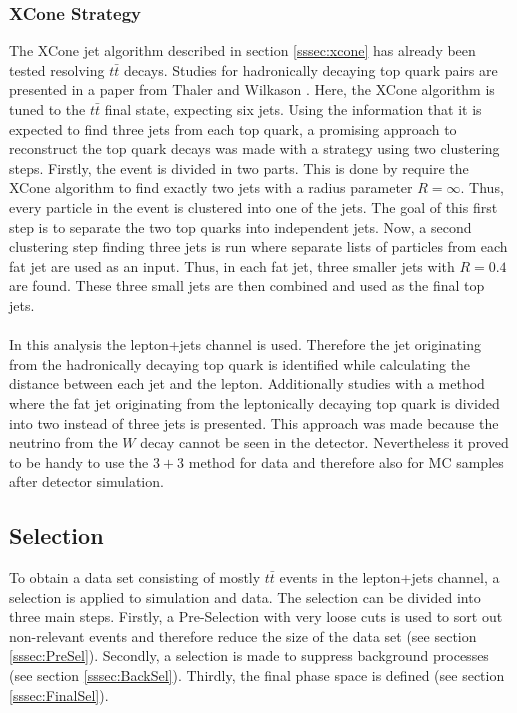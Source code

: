 \subsubsection{XCone Strategy}
	The XCone jet algorithm described in section \ref{sssec:xcone} has already been tested resolving $t\bar{t}$ decays. Studies for hadronically decaying top quark pairs are presented in a paper from Thaler and Wilkason \cite{xconetop}. Here, the XCone algorithm is tuned to the $t\bar{t}$ final state, expecting six jets. Using the information that it is expected to find three jets from each top quark, a promising approach to reconstruct the top quark decays was made with a strategy using two clustering steps. Firstly, the event is divided in two parts. This is done by require the XCone algorithm to find exactly two jets with a radius parameter $R=\infty$. Thus, every particle in the event is clustered into one of the jets. The goal of this first step is to separate the two top quarks into independent jets. Now, a second clustering step finding three jets is run where separate lists of particles from each fat jet are used as an input. Thus, in each fat jet, three smaller jets with $R=0.4$ are found. These three small jets are then combined and used as the final top jets. \\
	\\ In this analysis the lepton+jets channel is used. Therefore the jet originating from the hadronically decaying top quark is identified while calculating the distance between each jet and the lepton. Additionally studies with a method where the fat jet originating from the leptonically decaying top quark is divided into two instead of three jets is presented. This approach was made because the neutrino from the $W$ decay cannot be seen in the detector. Nevertheless it proved to be handy to use the $3+3$ method for data and therefore also for MC samples after detector simulation.   
	
\subsection{Selection}
	To obtain a data set consisting of mostly $t\bar{t}$ events in the lepton+jets channel, a selection is applied to simulation and data. The selection can be divided into three main steps. Firstly, a Pre-Selection with very loose cuts is used to sort out non-relevant events and therefore reduce the size of the data set (see section \ref{sssec:PreSel}). Secondly, a selection is made to suppress background processes (see section \ref{sssec:BackSel}). Thirdly, the final phase space is defined (see section \ref{sssec:FinalSel}).
